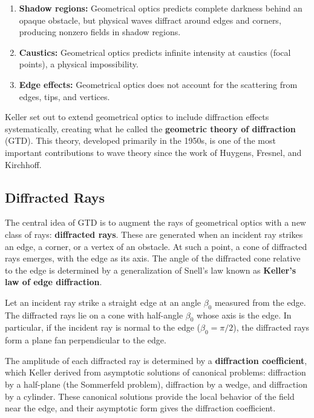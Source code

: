 \begin{enumerate}
  \item \textbf{Shadow regions:} Geometrical optics predicts complete darkness behind an opaque obstacle, but physical waves diffract around edges and corners, producing nonzero fields in shadow regions.
  \item \textbf{Caustics:} Geometrical optics predicts infinite intensity at caustics (focal points), a physical impossibility.
  \item \textbf{Edge effects:} Geometrical optics does not account for the scattering from edges, tips, and vertices.
\end{enumerate}

Keller set out to extend geometrical optics to include diffraction effects systematically, creating what he called the \textbf{geometric theory of diffraction} (GTD). This theory, developed primarily in the 1950s, is one of the most important contributions to wave theory since the work of Huygens, Fresnel, and Kirchhoff.

\subsection{Diffracted Rays}

The central idea of GTD is to augment the rays of geometrical optics with a new class of rays: \textbf{diffracted rays}. These are generated when an incident ray strikes an edge, a corner, or a vertex of an obstacle. At such a point, a cone of diffracted rays emerges, with the edge as its axis. The angle of the diffracted cone relative to the edge is determined by a generalization of Snell's law known as \textbf{Keller's law of edge diffraction}.

\begin{definition}
Let an incident ray strike a straight edge at an angle \(\beta_0\) measured from the edge. The diffracted rays lie on a cone with half-angle \(\beta_0\) whose axis is the edge. In particular, if the incident ray is normal to the edge (\(\beta_0 = \pi/2\)), the diffracted rays form a plane fan perpendicular to the edge.
\end{definition}

The amplitude of each diffracted ray is determined by a \textbf{diffraction coefficient}, which Keller derived from asymptotic solutions of canonical problems: diffraction by a half-plane (the Sommerfeld problem), diffraction by a wedge, and diffraction by a cylinder. These canonical solutions provide the local behavior of the field near the edge, and their asymptotic form gives the diffraction coefficient.

